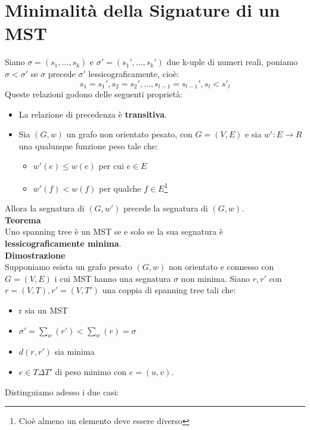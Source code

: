 \section{Minimalità della Signature di un MST}
Siano $\sigma = (s_1,\dots,s_k)$ e $\sigma' = (s_1',\dots,s_k')$ due k-uple di numeri reali, poniamo $ \sigma < \sigma'$ se $\sigma$ precede $\sigma'$ lessicograficamente, cioè:
\[s_1=s_1', s_2=s_2', \dots, s_{l-1}=s_{l-1}', s_l < s'_l\]
Queste relazioni godono delle seguenti proprietà:
\begin{itemize}
    \item La relazione di precedenza è \textbf{transitiva}.
    \item Sia $(G,w)$ un grafo non orientato pesato, con $G=(V,E)$ e sia $w':E\rightarrow R$ una qualunque funzione peso tale che:
        \begin{itemize}
            \item $w'(e)\leq w(e)$ per cui $e \in E$
            \item $w'(f)< w(f)$ per qualche $f \in E$\footnote{Cioè almeno un elemento deve essere diverso}
        \end{itemize}
\end{itemize}
Allora la segnatura di $(G,w')$ precede la segnatura di $(G,w)$.\\
\textbf{Teorema}\\
Uno spanning tree è un MST se e solo se la sua segnatura è \textbf{lessicograficamente minima}.\\
\textbf{Dimostrazione}\\
Supponiamo esista un grafo pesato $(G, w)$ non orientato e connesso con $G=(V,E)$ i cui MST hanno una segnatura $\sigma$ non minima. Siano $r,r'$ con $r=(V,T), r'=(V,T')$ una coppia di spanning tree tali che:
\begin{itemize}
    \item r sia un MST
    \item $\sigma'=\sum_w (r') < \sum_w (r) = \sigma$
    \item $d(r,r')$ sia minima
    \item $e \in T \Delta T'$ di peso minimo con $e = (u,v)$.
\end{itemize}
Distinguiamo adesso i due casi:
